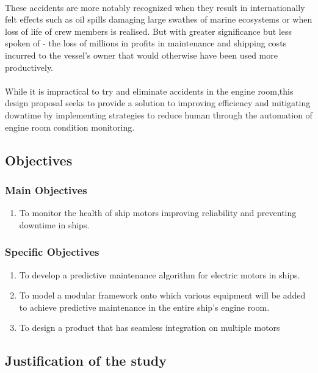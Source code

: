 \paragraph{}These accidents are more notably recognized when they result in internationally felt effects such as oil spills damaging large swathes of marine ecosystems or when loss of life of crew members is realised. But with greater significance but less spoken of - the loss of millions in profits in maintenance and shipping costs incurred to the vessel's owner that would otherwise have been used more productively.

\paragraph{}While it is impractical to try and eliminate accidents in the engine room,this design proposal seeks to provide a solution to improving efficiency and mitigating downtime by implementing strategies to reduce human through the automation of engine room condition monitoring\cite{stefanopoulou_mechatronics_nodate}.
\subsection{Objectives}
\subsubsection{Main Objectives}
\begin{enumerate}
\item To monitor the health of ship motors improving reliability and preventing downtime in ships.

\end{enumerate}
\subsubsection{Specific Objectives}
\begin{enumerate}
\item To develop a predictive maintenance algorithm for electric motors in ships.
\item To model a modular framework onto which various equipment will be added to achieve predictive maintenance in the entire ship's engine room. 
\item To design a product that has seamless integration on multiple motors
\end{enumerate}
\subsection{Justification of the study}
